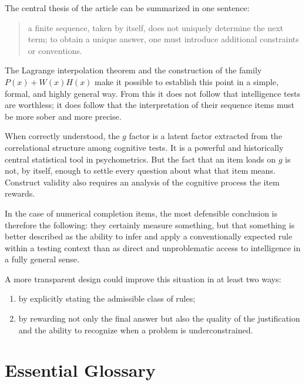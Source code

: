 \documentclass[10pt, a4paper]{article}
\theoremstyle{plain}
\theoremstyle{definition}
\theoremstyle{remark}
\begin{document}
The central thesis of the article can be summarized in one sentence:
\begin{quote}
a finite sequence, taken by itself, does not uniquely determine the next term;
to obtain a unique answer, one must introduce additional constraints or
conventions.
\end{quote}

The Lagrange interpolation theorem and the construction of the family
$P(x)+W(x)H(x)$ make it possible to establish this point in a simple, formal,
and highly general way. From this it does not follow that intelligence tests
are worthless; it does follow that the interpretation of their sequence items
must be more sober and more precise.

When correctly understood, the $g$ factor is a latent factor extracted from the
correlational structure among cognitive tests. It is a powerful and historically
central statistical tool in psychometrics. But the fact that an item loads on
$g$ is not, by itself, enough to settle every question about what that item
means. Construct validity also requires an analysis of the cognitive process the
item rewards.

In the case of numerical completion items, the most defensible conclusion is
therefore the following: they certainly measure something, but that something is
better described as the ability to infer and apply a conventionally expected
rule within a testing context than as direct and unproblematic access to
intelligence in a fully general sense.

A more transparent design could improve this situation in at least two ways:
\begin{enumerate}[label=\arabic*.]
    \item by explicitly stating the admissible class of rules;
    \item by rewarding not only the final answer but also the quality of the
          justification and the ability to recognize when a problem is
          underconstrained.
\end{enumerate}

\appendix

\section{Essential Glossary}
\label{sec:glossary}
\end{document}
